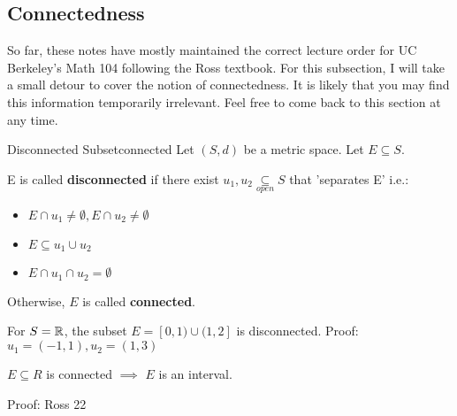 \subsection{Connectedness}
So far, these notes have mostly maintained the correct lecture order for UC Berkeley's Math 104 following the Ross textbook. For this subsection, I will take a small detour to cover the notion of connectedness. It is likely that you may find this information temporarily irrelevant. Feel free to come back to this section at any time.
\begin{defn}{Disconnected Subset}{connected}
Let \((S, d)\) be a metric space. Let \(E \subseteq S\).\newline 

E is called \textbf{disconnected} if there exist \(u_1, u_2 \underset{open}{\subseteq} S\) that 'separates E' i.e.:
\begin{itemize}
  \item \(E \cap u_1 \neq \emptyset, E \cap u_2 \neq \emptyset\)
  \item \(E \subseteq u_1 \cup u_2\)
  \item \(E \cap u_1 \cap u_2 = \emptyset\)
\end{itemize}
Otherwise, \(E\) is called \textbf{connected}.
\end{defn}

\begin{exmp}{}{}
For \(S = {\mathbb R}\), the subset \(E = [0, 1) \cup (1, 2]\) is disconnected. Proof: \(u_1 = (-1, 1), u_2 = (1, 3)\)
\end{exmp}

\begin{thm}{}{}
\(E \subseteq R\) is connected \(\implies\) \(E\) is an interval.\newline 

Proof: Ross 22 %
\end{thm}











